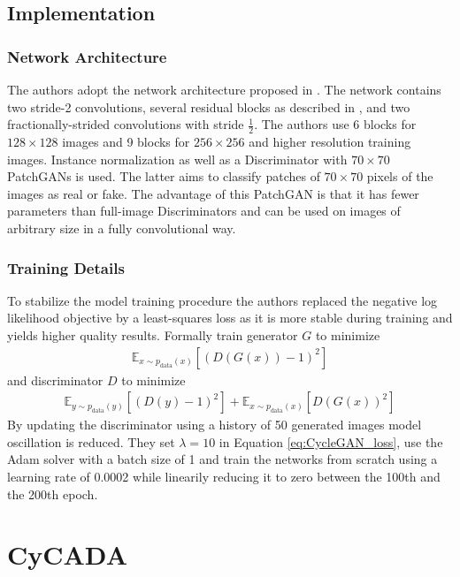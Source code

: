 \subsection{Implementation}
\subsubsection{Network Architecture}
The authors adopt the network architecture proposed in \cite{DBLP:journals/corr/JohnsonAL16}. The network contains two stride-2 convolutions, several residual blocks as described in \cite{DBLP:journals/corr/HeZRS15}, and two fractionally-strided convolutions with stride $\frac{1}{2}$. The authors use 6 blocks for $128 \times 128$ images and 9 blocks for $256 \times 256$ and higher resolution training images. Instance normalization as well as a Discriminator with $70 \times 70$ PatchGANs is used. The latter aims to classify patches of $70\times 70$ pixels of the images as real or fake. The advantage of this PatchGAN is that it has fewer parameters than full-image Discriminators and can be used on images of arbitrary size in a fully convolutional way.

\subsubsection{Training Details}
To stabilize the model training procedure the authors replaced the negative log likelihood objective by a least-squares loss as it is more stable during training and yields higher quality results. Formally train generator $G$ to minimize 
\begin{align*}
	\mathbb{E}_{x\sim p_{\text{data}}(x)}[(D(G(x)) - 1)^2]
\end{align*} 
and discriminator $D$ to minimize
\begin{align*}
	\mathbb{E}_{y\sim p_{\text{data}}(y)}[(D(y) - 1)^2] + \mathbb{E}_{x\sim p_{\text{data}}(x)}[D(G(x))^2]
\end{align*}
By updating the discriminator using a history of 50 generated images model oscillation is reduced. They set $\lambda = 10$ in Equation \ref{eq:CycleGAN_loss}, use the Adam solver with a batch size of 1 and train the networks from scratch using a learning rate of 0.0002 while linearily reducing it to zero between the 100th and the 200th epoch.

\section{CyCADA} 
